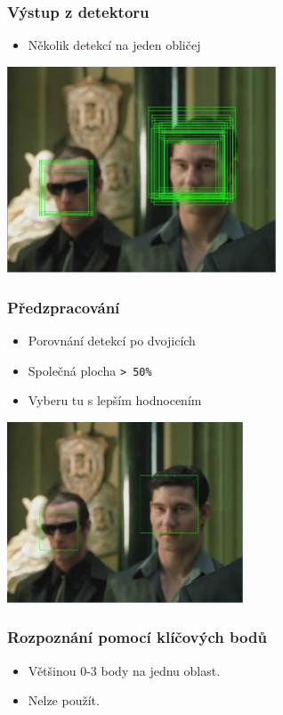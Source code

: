 \documentclass{beamer}
\begin{document}
	\begin{frame}[t,fragile]
		\frametitle{Výstup z detektoru}	
		
		\begin{itemize}
			\item Několik detekcí na jeden obličej
		\end{itemize}			
\begin{center}
\includegraphics[width=8cm]{img/detections.jpg}
\end{center}
	\end{frame}		
	\begin{frame}[t,fragile]
		\frametitle{Předzpracování}	
		
		\begin{itemize}
			\item Porovnání detekcí po dvojicích
			\item Společná plocha \verb|> 50%|
			\item Vyberu tu s lepším hodnocením
		\end{itemize}			
\begin{center}
\includegraphics[width=7cm]{img/sepDet.jpg}
\end{center}
	\end{frame}	
	\begin{frame}[t,fragile]
		\frametitle{Rozpoznání pomocí klíčových bodů}	
		
		\begin{itemize}
			\item Většinou 0-3 body na jednu oblast.
			\item Nelze použít.
		\end{itemize}			
	\end{frame}				
\end{document}
